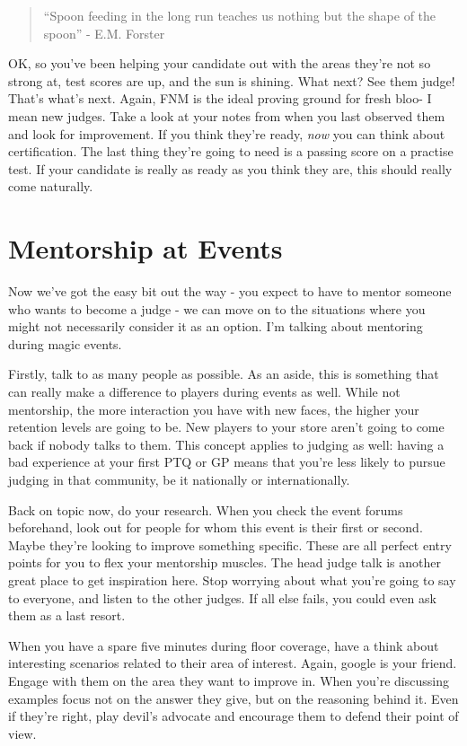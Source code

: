 \documentclass[10pt,a4paper]{article}
\begin{document}
\begin{quotation}
	``Spoon feeding in the long run teaches us nothing but the shape of the spoon'' - E.M. Forster
\end{quotation}

OK, so you've been helping your candidate out with the areas they're not so strong at, test scores are up, and the sun is shining. What next? See them judge! That's what's next. Again, FNM is the ideal proving ground for fresh bloo- I mean new judges. Take a look at your notes from when you last observed them and look for improvement. If you think they're ready, \textit{now} you can think about certification. The last thing they're going to need is a passing score on a practise test. If your candidate is really as ready as you think they are, this should really come naturally.

\section{Mentorship at Events}
Now we've got the easy bit out the way - you expect to have to mentor someone who wants to become a judge - we can move on to the situations where you might not necessarily consider it as an option. I'm talking about mentoring during magic events.

Firstly, talk to as many people as possible. As an aside, this is something that can really make a difference to players during events as well. While not mentorship, the more interaction you have with new faces, the higher your retention levels are going to be.  New players to your store aren't going to come back if nobody talks to them. This concept applies to judging as well: having a bad experience at your first PTQ or GP means that you're less likely to pursue judging in that community, be it nationally or internationally.

Back on topic now, do your research. When you check the event forums beforehand, look out for people for whom this event is their first or second. Maybe they're looking to improve something specific. These are all perfect entry points for you to flex your mentorship muscles. The head judge talk is another great place to get inspiration here. Stop worrying about what you're going to say to everyone, and listen to the other judges. If all else fails, you could even ask them as a last resort.
 
When you have a spare five minutes during floor coverage, have a think about interesting scenarios related to their area of interest. Again, google is your friend. Engage with them on the area they want to improve in. When you're discussing examples focus not on the answer they give, but on the reasoning behind it. Even if they're right, play devil's advocate and encourage them to defend their point of view.
\end{document}
